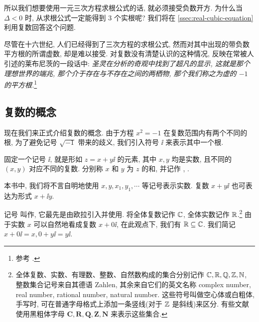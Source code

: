 所以我们想要使用一元三次方程求根公式的话, 就\alert{必须接受负数开方}.
为什么当 $\Delta<0$ 时, 从求根公式一定能得到 $3$ 个实根呢?
我们将在 \ref{ssec:real-cubic-equation}利用复数回答这个问题.

尽管在十六世纪, 人们已经得到了三次方程的求根公式, 然而对其中出现的带负数平方根的所谓虚数, 却是难以接受.
对复数没有清楚认识的这种情况, 反映在常被人引述的莱布尼茨的一段话中: \textcolor{third}{\itshape 圣灵在分析的奇观中找到了超凡的显示, 这就是那个理想世界的端兆, 那个介于存在与不存在之间的两栖物, 那个我们称之为虚的 $-1$ 的平方根.}\footnote{%
  参考 \cite[第13章2节]{Kline1990}.
}


\subsection{复数的概念}

现在我们来正式介绍复数的概念.
由于方程 $x^2=-1$ 在复数范围内有两个不同的根, 为了避免记号 $\sqrt{-1}$ 带来的歧义, 我们引入符号 $\ii$ 来表示其中一个根.

\begin{definition}
  固定一个记号 $\ii$, 就是形如 $z=x+y\ii$ 的元素, 其中 $x,y$ 均是实数, 且不同的 $(x,y)$ 对应不同的复数.
  分别称 $x$ 和 $y$ 为 $z$ 的和, 并记作 , .
\end{definition}

本书中, 我们将不言自明地使用 $x,y,x_1,y_1,\cdots$ 等记号表示实数.
复数 $x+y\ii$ 也可表达为形式 $x+\ii y$.

记号 \nouns{$\ii$} 叫作, 它最先是由欧拉引入并使用.
将\alert{全体复数记作 ${\mathbb{C}}$}, 全体实数记作 ${\mathbb{R}}$.\footnote{%
  全体复数、实数、有理数、整数、自然数构成的集合分别记作 ${\mathbb{C}},{\mathbb{R}},{\mathbb{Q}},{\mathbb{Z}},{\mathbb{N}}$, 整数集合记号来自其德语 Zahlen, 其余来自它们的英文名称 complex number, real number, rational number, natural number.
  这些符号叫做空心体或白粗体, 手写时, 可在普通字母格式上添加一条竖线(对于 ${\mathbb{Z}}$ 是斜线)来区分.
  有些文献使用黑粗体字母 $\mathbf{C,R,Q,Z,N}$ 来表示这些集合.
}
由于实数 $x$ 可以自然地看成复数 $x+0\ii$, 在此观点下, 我们有 ${\mathbb{R}}\subseteq {\mathbb{C}}$.
我们简记 $x+0\ii=x,0+y\ii=y\ii$.

